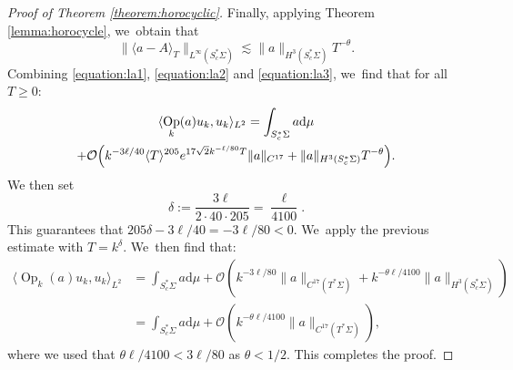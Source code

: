 \documentclass[10pt]{amsart}
\theoremstyle{plain}
\theoremstyle{definition}
\let\mc\mathcal
\newcommand{\dd}{\mathrm{d}}
\DeclareMathOperator{\Op}{Op}
\begin{document}
\begin{proof}[Proof of Theorem \ref{theorem:horocyclic}]
Finally, applying Theorem \ref{lemma:horocycle}, we~obtain that
\begin{equation}
\label{equation:la3}
\|\langle a-A\rangle_T\|_{L^\infty(S^*_c\Sigma)} \lesssim \|a\|_{H^{3}(S^*_c\Sigma)} T^{-\theta}.
\end{equation}
Combining \eqref{equation:la1}, \eqref{equation:la2} and \eqref{equation:la3}, we~find that for all $T \geq 0$:
\begin{multline*}
\langle \Op_k(a)u_k,u_k\rangle_{L^2}= \int_{S^*_c\Sigma} a \dd \mu \\
+ \mc{O}\Bigl(k^{-3\ell/40} \langle T\rangle^{205} e^{17\sqrt{2}k^{-\ell/80} T} \|a\|_{C^{17}} + \|a\|_{H^{3}(S^*_c\Sigma)} T^{-\theta}\Bigr).
\end{multline*}
We then set
\[
\delta := \dfrac{3 \ell}{2 \cdot 40 \cdot 205} = \dfrac{\ell}{4100}.
\]
This guarantees that $205 \delta-3\ell/40 =-3\ell/80 < 0$. We~apply the previous estimate with $T = k^{\delta}$. We~then find that:
\[
\begin{split}
\langle \Op_k(a)u_k,u_k\rangle_{L^2} &= \int_{S^*_c\Sigma} a \dd \mu + \mc{O}(k^{-3\ell/80} \|a\|_{C^{17}(T^*\Sigma)} + k^{-\theta \ell/4100}\|a\|_{H^3(S^*_c\Sigma)}) \\
& = \int_{S^*_c\Sigma} a \dd \mu + \mc{O}(k^{-\theta \ell/4100}\|a\|_{C^{17}(T^*\Sigma)}),
\end{split}
\]
where we used that $\theta \ell/4100 < 3\ell/80$ as $\theta < 1/2$. This completes the proof.
\end{proof}
\end{document}
